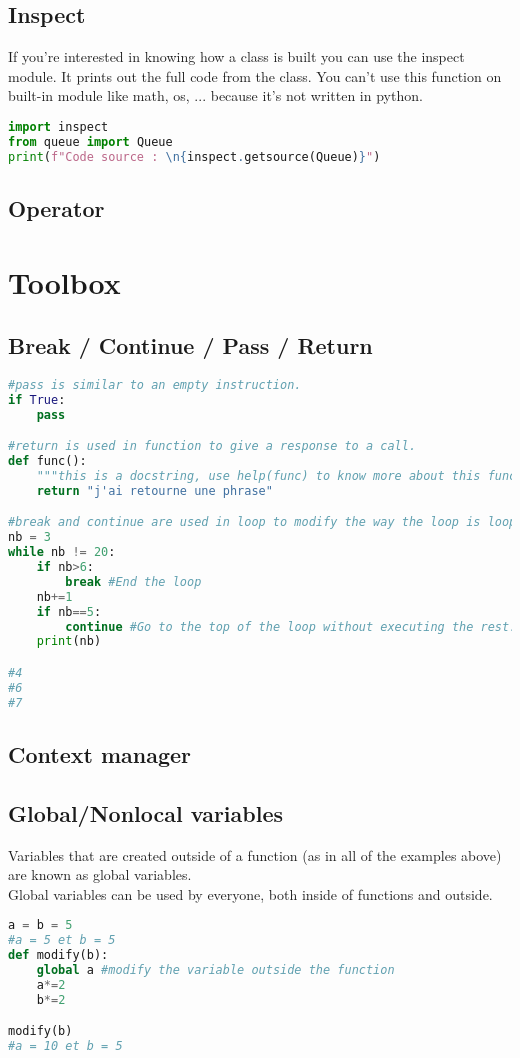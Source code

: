 \documentclass[a4paper, 12pt, titlepage]{scrartcl} %
\begin{document}
\subsection{Inspect}
If you're interested in knowing how a class is built you can use the inspect module. It prints out the full code from the class. You can't use this function on built-in module like math, os, ... because it's not written in python.
\begin{lstlisting}[language=Python]
import inspect
from queue import Queue
print(f"Code source : \n{inspect.getsource(Queue)}")
\end{lstlisting} \vspace{5mm}

\subsection{Operator}

\newpage
\section{Toolbox}
\subsection{Break / Continue / Pass / Return}
\label{subsec:BCPR}
\begin{lstlisting}[language=Python]
#pass is similar to an empty instruction.
if True:
    pass

#return is used in function to give a response to a call.
def func():
	"""this is a docstring, use help(func) to know more about this function."""
	return "j'ai retourne une phrase"

#break and continue are used in loop to modify the way the loop is looping.
nb = 3
while nb != 20:
	if nb>6:
		break #End the loop
	nb+=1
	if nb==5:
		continue #Go to the top of the loop without executing the rest.	
	print(nb)

#4
#6
#7
\end{lstlisting} \vspace{5mm}

\subsection{Context manager}
\label{subsec:ContextManager}

\subsection{Global/Nonlocal variables}
\label{subsec:Global/Nonlocal}
Variables that are created outside of a function (as in all of the examples above) are known as global variables.\\
Global variables can be used by everyone, both inside of functions and outside.
\begin{lstlisting}[language=Python]
a = b = 5
#a = 5 et b = 5
def modify(b):
	global a #modify the variable outside the function
	a*=2
	b*=2

modify(b)
#a = 10 et b = 5
\end{lstlisting} \vspace{5mm}
\end{document}
